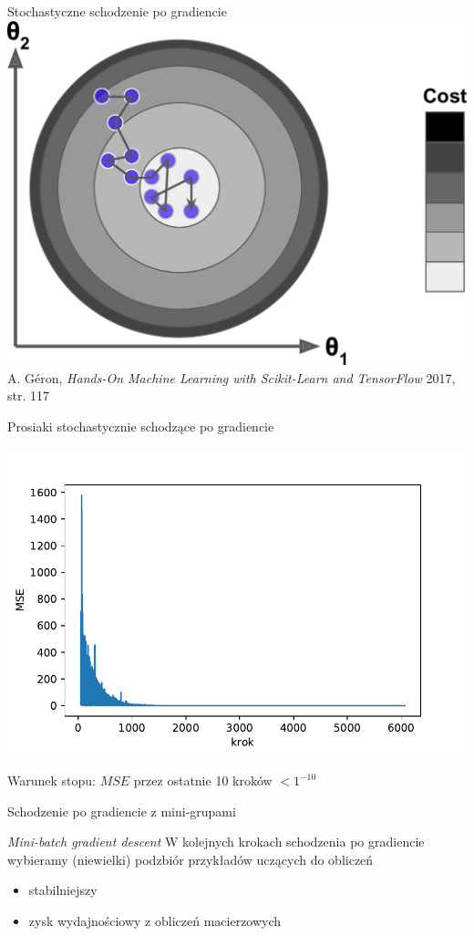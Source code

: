 \documentclass{sa}
\begin{document}
\begin{frame}{Stochastyczne schodzenie po gradiencie}
\centering
\includegraphics[width=.7\textwidth]{sgd.png}
{\vfill\footnotesize A. Géron, \emph{Hands-On Machine Learning with Scikit-Learn and TensorFlow} 2017, str. 117}
\end{frame}

\begin{frame}{Prosiaki stochastycznie schodzące po gradiencie}
\begin{center}
\includegraphics[width=.9\textwidth]{sgd-prosiaki.pdf}
\end{center}

Warunek stopu: $MSE$ przez ostatnie 10 kroków $<1^{-10}$
\end{frame}

\begin{frame}{Schodzenie po gradiencie z mini-grupami}
\begin{block}{\emph{Mini-batch gradient descent}}
W kolejnych krokach schodzenia po gradiencie wybieramy (niewielki) podzbiór przykładów uczących do obliczeń
\end{block}
\begin{itemize}
\item stabilniejszy
\item zysk wydajnościowy z obliczeń macierzowych
\end{itemize}
\end{frame}
\end{document}
